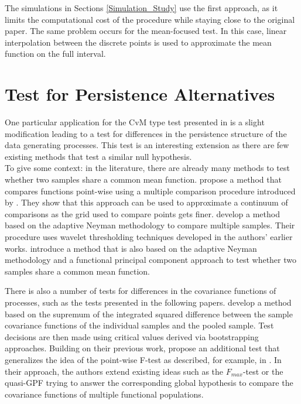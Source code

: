 \documentclass[12pt, a4paper]{article}
\theoremstyle{MAstyle} \newtheorem{assumption}{Assumption}[section]
\theoremstyle{MAstyle} \newtheorem{definition}{Definition}[section]
\theoremstyle{MAstyle} \newtheorem{theorem}{Theorem}[section]
\begin{document}
			The simulations in Sections \ref{Simulation_Study} use the first approach, as it limits the computational cost of the procedure while staying close to the original paper. The same problem occurs for the mean-focused test. In this case, linear interpolation between the discrete points is used to approximate the mean function on the full interval.

		
	\section{Test for Persistence Alternatives}\label{variant}
		One particular application for the CvM type test presented in \cite{bugni_permutation_2021} is a slight modification leading to a test for differences in the persistence structure of the data generating processes. This test is an interesting extension as there are few existing methods that test a similar null hypothesis.\\
		
		To give some context: in the literature, there are already many methods to test whether two samples share a common mean function. 
		\cite{cox_pointwise_2008} propose a method that compares functions point-wise using a multiple comparison procedure introduced by \cite{westfall_resampling-based_1993}. They show that this approach can be used to approximate a continuum of comparisons as the grid used to compare points gets finer.
		\cite{fan_test_1998} develop a method based on the adaptive Neyman methodology to compare multiple samples. Their procedure uses wavelet thresholding techniques developed in the authors' earlier works. 
		\cite{lee_two_2015} introduce a method that is also based on the adaptive Neyman methodology and a functional principal component approach to test whether two samples share a common mean function.
		
		
		There is also a number of tests for differences in the covariance functions of processes, such as the tests presented in the following papers. 
		\cite{guo_testing_2018} develop a method based on the supremum of the integrated squared difference between the sample covariance functions of the individual samples and the pooled sample. Test decisions are then made using critical values derived via bootstrapping approaches.		Building on their previous work, \cite{guo_new_2019} propose an additional test that generalizes the idea of the point-wise F-test as described, for example, in \cite{ramsay_functional_2005}. In their approach, the authors extend existing ideas such as the $F_{\textit{max}}$-test or the quasi-GPF trying to answer the corresponding global hypothesis to compare the covariance functions of multiple functional populations.
\end{document}
